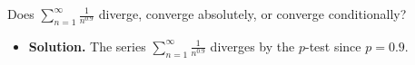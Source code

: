\documentclass{article}
\begin{document}
\noindent
Does $\displaystyle \sum_{n=1}^\infty \frac1{n^{0.9}}$
diverge, converge absolutely, or converge conditionally?

\begin{itemize}

\item {\bf Solution.} The series $\displaystyle \sum_{n=1}^\infty \frac1{n^{0.9}}$ diverges by the $p$-test since $p=0.9$.

\end{itemize}
\end{document}
